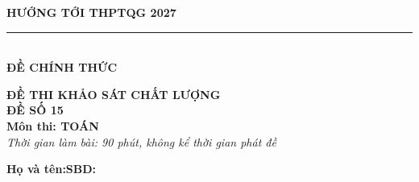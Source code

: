 \documentclass[12pt,a4paper]{article}
\begin{document}
\begin{minipage}[t]{0.40\textwidth}\centering
\textbf{HƯỚNG TỚI THPTQG 2027}\\[-2pt]
\rule{3.2cm}{0.6pt}\\[4pt]\textbf{ĐỀ CHÍNH THỨC}
\end{minipage}\hfill
\begin{minipage}[t]{0.58\textwidth}\centering
\textbf{ĐỀ THI KHẢO SÁT CHẤT LƯỢNG}\\
\textbf{ĐỀ SỐ 15}\\\textbf{Môn thi: TOÁN}\\
\textit{\small Thời gian làm bài: 90 phút, không kể thời gian phát đề}
\end{minipage}
\vspace{0.2cm}
\begin{minipage}[b]{0.78\textwidth}
\textbf{Họ và tên:}\dotfill\textbf{SBD:}\makebox[3.5cm]{\dotfill}
\end{minipage}\hfill
\begin{minipage}[b]{0.20\textwidth}\hfill
{}
\end{minipage}
\vspace{0.2cm}
\end{document}
